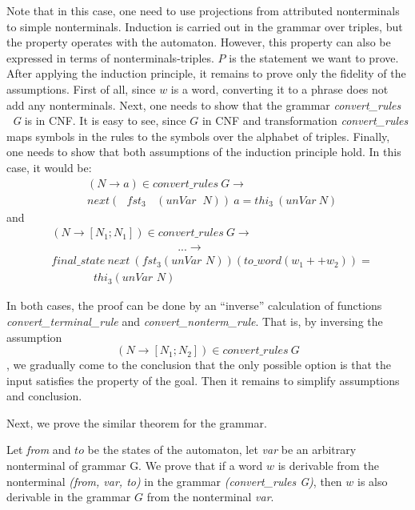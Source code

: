 Note that in this case, one need to use projections from attributed nonterminals to simple nonterminals.
Induction is carried out in the grammar over triples, but the property operates with the automaton. However, this property can also be expressed in terms of nonterminals-triples.
$P$ is the statement we want to prove.
After applying the induction principle, it remains to prove only the fidelity of the assumptions.
First of all, since $ w $ is a word, converting it to a phrase does not add any nonterminals.
Next, one needs to show that the grammar \textit{convert\_rules \ G} is in CNF. It is easy to see, since $G$ in CNF and transformation \textit{convert\_rules} maps symbols in the rules to the symbols over the alphabet of triples.
Finally, one needs to show that both assumptions of the induction principle hold.  
In this case, it would be: 
\begin{align*}
& (N \to a) \in \textit{convert\_rules} \ G \to \ \ \ \ \ \ \ \ \ \ \ \ \ \ \ \ \ \ \ \ \ \ \ \\
& next (\textit{ $fst_{3}$ } \ (\textit{unVar } \ N)) \ a = \textit{$thi_3$} \ (\textit{unVar} \ N) 
\end{align*}
and 
\begin{align*}
& (N \to [N_1; N_1]) \in \textit{convert\_rules} \ G  \to \\
& \ \ \ \ \ \ \ \ \ \ \ \ \ \ \ \ \ \ \ \ \ \ \ \ \ \ \ \ \ \ \ \ \ \ \ \ \ \ \ \ \ \ \ \ \ \ \ \ \ \ \ ... \to \\
& \textit{final\_state} \ \textit{next} \ (fst_3 (\textit{unVar  N})) (to\_word (w_1 ++ w_2)) = \\
& \ \ \ \ \ \ \ \ \ \ \ \ \ \ \ \ \ thi_3 (\textit{unVar  N})
\end{align*}

In both cases, the proof can be done by an ``inverse'' calculation of functions \textit{convert\_terminal\_rule} and \textit{convert\_nonterm\_rule}. 
That is, by inversing the assumption $$ (N \to [N_1; N_2]) \in \textit{convert\_rules} \ G$$, we gradually come to the conclusion that the only possible option is that the input satisfies the property of the goal. Then it remains to simplify assumptions and conclusion.


Next, we prove the similar theorem for the grammar.

\begin{theorem}
	Let \textit{from} and $to$ be the states of the automaton, let \textit{var} be an arbitrary nonterminal of grammar G. We prove that if a word $w$ is derivable from the nonterminal \textit{(from, var, to)} in the grammar \textit{(convert\_rules G)}, then $w$ is also derivable in the grammar $G$ from the nonterminal \textit{var}.
\end{theorem}

